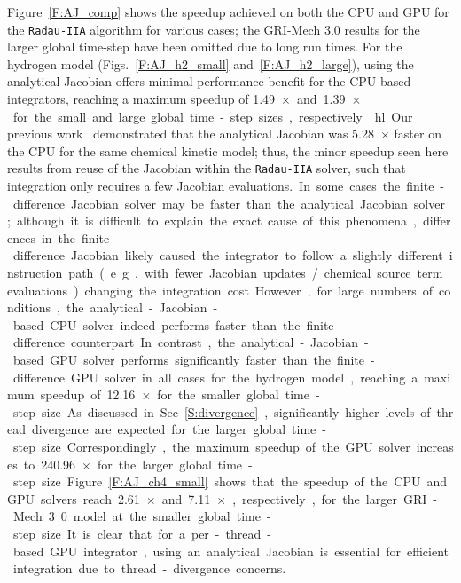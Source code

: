 \documentclass[preprint,review,11pt]{elsarticle}
\DeclareRobustCommand{\hlg}[1]{\sethlcolor{green}\hl{#1}}
\begin{document}
Figure~\ref{F:AJ_comp} shows the speedup achieved on both the CPU and GPU for the \texttt{Radau-IIA} algorithm for various cases; the GRI-Mech 3.0 results for the larger global time-step have been omitted due to long run times.
For the hydrogen model (Figs.~\ref{F:AJ_h2_small} and~\ref{F:AJ_h2_large}), using the analytical Jacobian offers minimal performance benefit for the CPU-based integrators, reaching a maximum speedup of \SI{1.49}{$\times$} and \SI{1.39}{$\times$} for the small and large global time-step sizes, respectively.
\hlg{Our previous work~\cite{Niemeyer:2016aa} demonstrated that the analytical Jacobian was {\SI{5.28}{$\times$}} faster on the CPU for the same chemical kinetic model; thus, the minor speedup seen here results from reuse of the Jacobian within the \texttt{Radau-IIA} solver, such that integration only requires a few Jacobian evaluations.}
In some cases the finite-difference Jacobian solver may be faster than the analytical Jacobian solver; although it is difficult to explain the exact cause of this phenomena, differences in the finite-difference Jacobian likely caused the integrator to follow a slightly different instruction path (e.g., with fewer Jacobian updates\slash chemical source term evaluations) changing the integration cost.
However, for large numbers of conditions, the analytical-Jacobian-based CPU solver indeed performs faster than the finite-difference counterpart.
In contrast, the analytical-Jacobian-based GPU solver performs significantly faster than the finite-difference GPU solver in all cases for the hydrogen model, reaching a maximum speedup of \SI{12.16}{$\times$} for the smaller global time-step size.
As discussed in Sec.~\ref{S:divergence}, significantly higher levels of thread divergence are expected for the larger global time-step size.
Correspondingly, the maximum speedup of the GPU solver increases to \SI{240.96}{$\times$} for the larger global time-step size.
Figure~\ref{F:AJ_ch4_small} shows that the speedup of the CPU and GPU solvers reach \SI{2.61}{$\times$} and \SI{7.11}{$\times$}, respectively, for the larger GRI-Mech 3.0 model at the smaller global time-step size.
It is clear that for a per-thread-based GPU integrator, using an analytical Jacobian is essential for efficient integration due to thread-divergence concerns.
\end{document}
